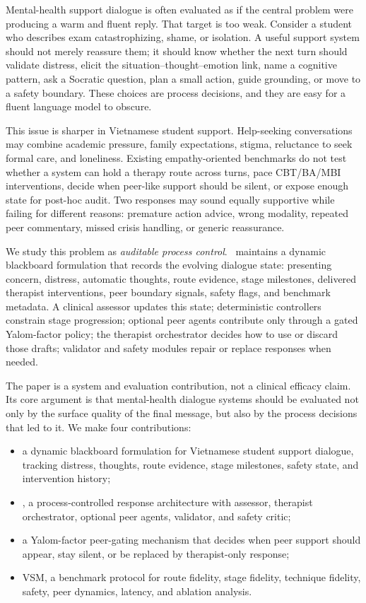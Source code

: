 Mental-health support dialogue is often evaluated as if the central problem were producing a warm and fluent reply. That target is too weak. Consider a student who describes exam catastrophizing, shame, or isolation. A useful support system should not merely reassure them; it should know whether the next turn should validate distress, elicit the situation--thought--emotion link, name a cognitive pattern, ask a Socratic question, plan a small action, guide grounding, or move to a safety boundary. These choices are process decisions, and they are easy for a fluent language model to obscure.

This issue is sharper in Vietnamese student support. Help-seeking conversations may combine academic pressure, family expectations, stigma, reluctance to seek formal care, and loneliness. Existing empathy-oriented benchmarks do not test whether a system can hold a therapy route across turns, pace CBT/BA/MBI interventions, decide when peer-like support should be silent, or expose enough state for post-hoc audit. Two responses may sound equally supportive while failing for different reasons: premature action advice, wrong modality, repeated peer commentary, missed crisis handling, or generic reassurance.

We study this problem as \emph{auditable process control}. \trace\ maintains a dynamic blackboard formulation that records the evolving dialogue state: presenting concern, distress, automatic thoughts, route evidence, stage milestones, delivered therapist interventions, peer boundary signals, safety flags, and benchmark metadata. A clinical assessor updates this state; deterministic controllers constrain stage progression; optional peer agents contribute only through a gated Yalom-factor policy; the therapist orchestrator decides how to use or discard those drafts; validator and safety modules repair or replace responses when needed.

The paper is a system and evaluation contribution, not a clinical efficacy claim. Its core argument is that mental-health dialogue systems should be evaluated not only by the surface quality of the final message, but also by the process decisions that led to it. We make four contributions:
\begin{itemize}[leftmargin=*]
    \item a dynamic blackboard formulation for Vietnamese student support dialogue, tracking distress, thoughts, route evidence, stage milestones, safety state, and intervention history;
    \item \trace, a process-controlled response architecture with assessor, therapist orchestrator, optional peer agents, validator, and safety critic;
    \item a Yalom-factor peer-gating mechanism that decides when peer support should appear, stay silent, or be replaced by therapist-only response;
    \item VSM, a benchmark protocol for route fidelity, stage fidelity, technique fidelity, safety, peer dynamics, latency, and ablation analysis.
\end{itemize}
